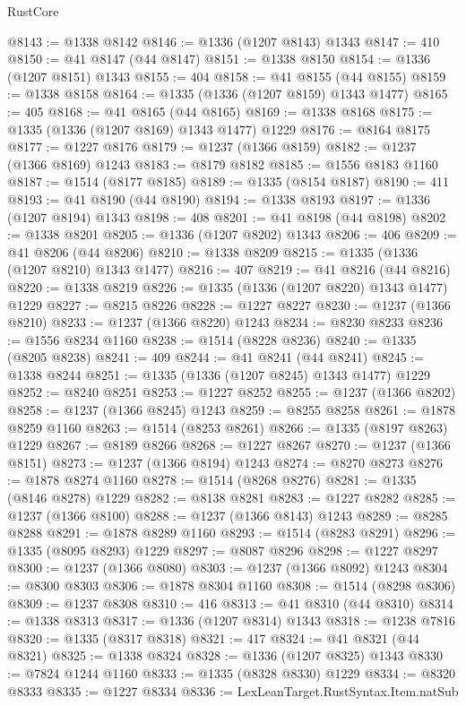 \begin{lexlean}{RustCore}
\begin{coremodule}
@8143 := @1338 @8142
@8146 := @1336 (@1207 @8143) @1343
@8147 := 410
@8150 := @41 @8147 (@44 @8147)
@8151 := @1338 @8150
@8154 := @1336 (@1207 @8151) @1343
@8155 := 404
@8158 := @41 @8155 (@44 @8155)
@8159 := @1338 @8158
@8164 := @1335 (@1336 (@1207 @8159) @1343 @1477)
@8165 := 405
@8168 := @41 @8165 (@44 @8165)
@8169 := @1338 @8168
@8175 := @1335 (@1336 (@1207 @8169) @1343 @1477) @1229
@8176 := @8164 @8175
@8177 := @1227 @8176
@8179 := @1237 (@1366 @8159)
@8182 := @1237 (@1366 @8169) @1243
@8183 := @8179 @8182
@8185 := @1556 @8183 @1160
@8187 := @1514 (@8177 @8185)
@8189 := @1335 (@8154 @8187)
@8190 := 411
@8193 := @41 @8190 (@44 @8190)
@8194 := @1338 @8193
@8197 := @1336 (@1207 @8194) @1343
@8198 := 408
@8201 := @41 @8198 (@44 @8198)
@8202 := @1338 @8201
@8205 := @1336 (@1207 @8202) @1343
@8206 := 406
@8209 := @41 @8206 (@44 @8206)
@8210 := @1338 @8209
@8215 := @1335 (@1336 (@1207 @8210) @1343 @1477)
@8216 := 407
@8219 := @41 @8216 (@44 @8216)
@8220 := @1338 @8219
@8226 := @1335 (@1336 (@1207 @8220) @1343 @1477) @1229
@8227 := @8215 @8226
@8228 := @1227 @8227
@8230 := @1237 (@1366 @8210)
@8233 := @1237 (@1366 @8220) @1243
@8234 := @8230 @8233
@8236 := @1556 @8234 @1160
@8238 := @1514 (@8228 @8236)
@8240 := @1335 (@8205 @8238)
@8241 := 409
@8244 := @41 @8241 (@44 @8241)
@8245 := @1338 @8244
@8251 := @1335 (@1336 (@1207 @8245) @1343 @1477) @1229
@8252 := @8240 @8251
@8253 := @1227 @8252
@8255 := @1237 (@1366 @8202)
@8258 := @1237 (@1366 @8245) @1243
@8259 := @8255 @8258
@8261 := @1878 @8259 @1160
@8263 := @1514 (@8253 @8261)
@8266 := @1335 (@8197 @8263) @1229
@8267 := @8189 @8266
@8268 := @1227 @8267
@8270 := @1237 (@1366 @8151)
@8273 := @1237 (@1366 @8194) @1243
@8274 := @8270 @8273
@8276 := @1878 @8274 @1160
@8278 := @1514 (@8268 @8276)
@8281 := @1335 (@8146 @8278) @1229
@8282 := @8138 @8281
@8283 := @1227 @8282
@8285 := @1237 (@1366 @8100)
@8288 := @1237 (@1366 @8143) @1243
@8289 := @8285 @8288
@8291 := @1878 @8289 @1160
@8293 := @1514 (@8283 @8291)
@8296 := @1335 (@8095 @8293) @1229
@8297 := @8087 @8296
@8298 := @1227 @8297
@8300 := @1237 (@1366 @8080)
@8303 := @1237 (@1366 @8092) @1243
@8304 := @8300 @8303
@8306 := @1878 @8304 @1160
@8308 := @1514 (@8298 @8306)
@8309 := @1237 @8308
@8310 := 416
@8313 := @41 @8310 (@44 @8310)
@8314 := @1338 @8313
@8317 := @1336 (@1207 @8314) @1343
@8318 := @1238 @7816
@8320 := @1335 (@8317 @8318)
@8321 := 417
@8324 := @41 @8321 (@44 @8321)
@8325 := @1338 @8324
@8328 := @1336 (@1207 @8325) @1343
@8330 := @7824 @1244 @1160
@8333 := @1335 (@8328 @8330) @1229
@8334 := @8320 @8333
@8335 := @1227 @8334
@8336 := LexLeanTarget.RustSyntax.Item.natSub

\end{coremodule}
\end{lexlean}
